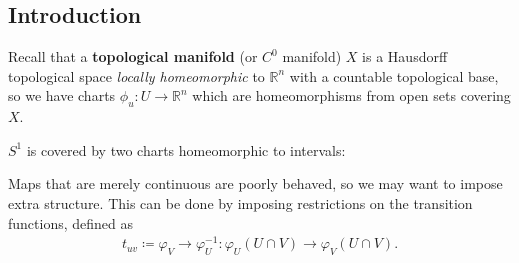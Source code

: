 \hypertarget{introduction}{%
\subsection{Introduction}\label{introduction}}

\begin{definition}

Recall that a \textbf{topological manifold} (or \(C^0\) manifold) \(X\)
is a Hausdorff topological space \emph{locally homeomorphic} to
\({\mathbb{R}}^n\) with a countable topological base, so we have charts
\(\phi_u: U\to {\mathbb{R}}^n\) which are homeomorphisms from open sets
covering \(X\).

\end{definition}

\begin{example}

\(S^1\) is covered by two charts homeomorphic to intervals:

\begin{figure}
\centering
{}
\end{figure}

\end{example}

\begin{remark}

Maps that are merely continuous are poorly behaved, so we may want to
impose extra structure. This can be done by imposing restrictions on the
transition functions, defined as
\begin{align*}
t_{uv} \coloneqq\varphi_V \to \varphi_U ^{-1} : \varphi_U(U \cap V) \to \varphi_V(U \cap V)
.\end{align*}

\end{remark}

